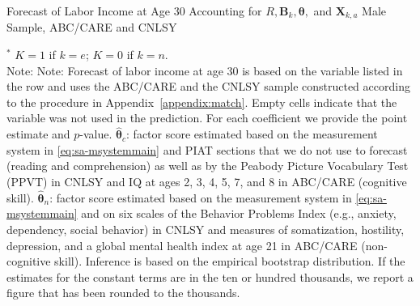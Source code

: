 \begin{table}
\begin{threeparttable}
\caption{Forecast of Labor Income at Age 30 Accounting for $R, \bm{B}_k, \bm{\theta},$ and $\bm{X}_{k,a}$ Male Sample, ABC/CARE and CNLSY}
\label{table:end2}
\centering
\scriptsize

\begin{tablenotes}
\footnotesize
\item $^\ast$ $K=1$ if $k=e$; $K=0$ if $k=n$.\\
Note: Note: Forecast of labor income at age 30 is based on the variable listed in the row and uses the ABC/CARE and the CNLSY sample constructed according to the procedure in Appendix~\ref{appendix:match}. Empty cells indicate that the variable was not used in the prediction. For each coefficient we provide the point estimate and $p$-value. $\hat{\bm{\theta}}_{c}$: factor score estimated based on the measurement system in \eqref{eq:sa-msystemmain} and PIAT sections that we do not use to forecast (reading and comprehension) as well as by the Peabody Picture Vocabulary Test (PPVT) in CNLSY and IQ at ages 2, 3, 4, 5, 7, and 8 in ABC/CARE (cognitive skill). $\hat{\bm{\theta}}_{n}$: factor score estimated based on the measurement system in \eqref{eq:sa-msystemmain} and on six scales of the Behavior Problems Index (e.g., anxiety, dependency, social behavior) in CNLSY and measures of somatization, hostility, depression, and a global mental health index at age 21 in ABC/CARE (non-cognitive skill). Inference is based on the empirical bootstrap distribution. If the estimates for the constant terms are in the ten or hundred thousands, we report a figure that has been rounded to the thousands.
\end{tablenotes}
\end{threeparttable}
\end{table}


